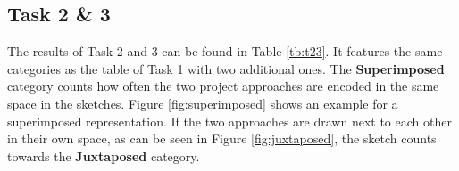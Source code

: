 \begin{table}[h]
	\centering
	\caption{\textit{This table shows the results of the first task of the Drawing Study. The first row of numbers shows the respective counts of every category. The \textbf{Explicit...} category is further split up into its four sub-categories and their respective counts.}}
	\label{tb:t1}
\end{table}


\subsection*{Task 2 \& 3}
The results of Task 2 and 3 can be found in Table \ref{tb:t23}. It features the same categories as the table of Task 1 with two additional ones. The \textbf{Superimposed} category counts how often the two project approaches are encoded in the same space in the sketches. Figure \ref{fig:superimposed} shows an example for a superimposed representation. If the two approaches are drawn next to each other in their own space, as can be seen in Figure \ref{fig:juxtaposed}, the sketch counts towards the \textbf{Juxtaposed} category.

